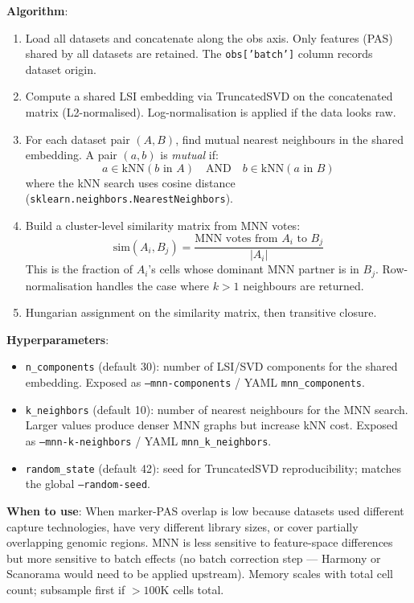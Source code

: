 \documentclass[11pt,a4paper]{article}
\begin{document}
\textbf{Algorithm}:
\begin{enumerate}
  \item Load all datasets and concatenate along the obs axis. Only features (PAS)
        shared by all datasets are retained. The \texttt{obs['batch']} column records
        dataset origin.
  \item Compute a shared LSI embedding via TruncatedSVD on the concatenated matrix
        (L2-normalised). Log-normalisation is applied if the data looks raw.
  \item For each dataset pair $(A, B)$, find mutual nearest neighbours in the shared
        embedding. A pair $(a, b)$ is \emph{mutual} if:
        \[
          a \in \text{kNN}(b \text{ in } A) \quad \text{AND} \quad b \in \text{kNN}(a \text{ in } B)
        \]
        where the kNN search uses cosine distance
        (\texttt{sklearn.neighbors.NearestNeighbors}).
  \item Build a cluster-level similarity matrix from MNN votes:
        \[
          \text{sim}(A_i, B_j) = \frac{\text{MNN votes from } A_i \text{ to } B_j}{|A_i|}
        \]
        This is the fraction of $A_i$'s cells whose dominant MNN partner is in $B_j$.
        Row-normalisation handles the case where $k > 1$ neighbours are returned.
  \item Hungarian assignment on the similarity matrix, then transitive closure.
\end{enumerate}

\textbf{Hyperparameters}:
\begin{itemize}
  \item \texttt{n\_components} (default 30): number of LSI/SVD components for the
        shared embedding. Exposed as \texttt{--mnn-components} / YAML
        \texttt{mnn\_components}.
  \item \texttt{k\_neighbors} (default 10): number of nearest neighbours for the MNN
        search. Larger values produce denser MNN graphs but increase kNN cost.
        Exposed as \texttt{--mnn-k-neighbors} / YAML \texttt{mnn\_k\_neighbors}.
  \item \texttt{random\_state} (default 42): seed for TruncatedSVD reproducibility;
        matches the global \texttt{--random-seed}.
\end{itemize}

\textbf{When to use}: When marker-PAS overlap is low because datasets used different
capture technologies, have very different library sizes, or cover partially overlapping
genomic regions. MNN is less sensitive to feature-space differences but more sensitive
to batch effects (no batch correction step --- Harmony or Scanorama would need to be
applied upstream). Memory scales with total cell count; subsample first if $> 100$K
cells total.
\end{document}
